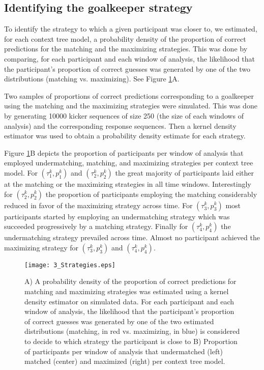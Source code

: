 \documentclass[fleqn,10pt]{wlscirep}
\begin{document}
\subsection*{Identifying the goalkeeper strategy}

To identify the strategy to which a given participant was closer to, we estimated, for each context tree model, a probability density of the proportion of correct predictions for the matching and the maximizing strategies. This was done by comparing, for each participant and each window of analysis, the likelihood that the participant's proportion of correct guesses was generated by one of the two distributions (matching vs. maximizing). See Figure \ref{fig:strategies}A. 

Two samples of proportions of correct predictions corresponding to a goalkeeper using the matching and the maximizing strategies were simulated. This was done by generating 10000 kicker sequences of size 250 (the size of each windows of analysis) and the corresponding response sequences. Then a kernel density estimator was used to obtain a probability density estimate for each strategy. 

Figure \ref{fig:strategies}B depicts the proportion of participants per window of analysis that employed undermatching, matching, and maximizing strategies per context tree model. For $(\tau^k_1, p^k_1)$ and $(\tau^k_2, p^k_2)$ the great majority of participants laid either at the matching or the maximizing strategies in all time windows. Interestingly for $(\tau^k_2, p^k_2)$ the proportion of participants employing the matching considerably reduced in favor of the maximizing strategy across time. For $(\tau^k_3, p^k_3)$ most participants started by employing an undermatching strategy which was succeeded progressively by a matching strategy. Finally for $(\tau^k_4, p^k_4)$ the undermatching strategy prevailed across time. Almost no participant achieved the maximizing strategy for $(\tau^k_3, p^k_3)$ and $(\tau^k_4, p^k_4)$. 

\begin{figure}[h!]
	\texttt{[image: 3\_Strategies.eps]}%
	\caption{A) A probability density of the proportion of correct predictions for matching and  maximizing strategies was estimated using a kernel density estimator on simulated data. For each participant and each window of analysis, the likelihood that the participant’s proportion of correct guesses was generated by one of the two estimated distributions (matching, in red vs. maximizing, in blue) is considered to decide to which strategy the participant is close to B) Proportion of participants per window of analysis that undermatched (left) matched (center) and maximized (right) per context tree model.}    
	\label{fig:strategies}%
\end{figure}
\FloatBarrier
\end{document}
